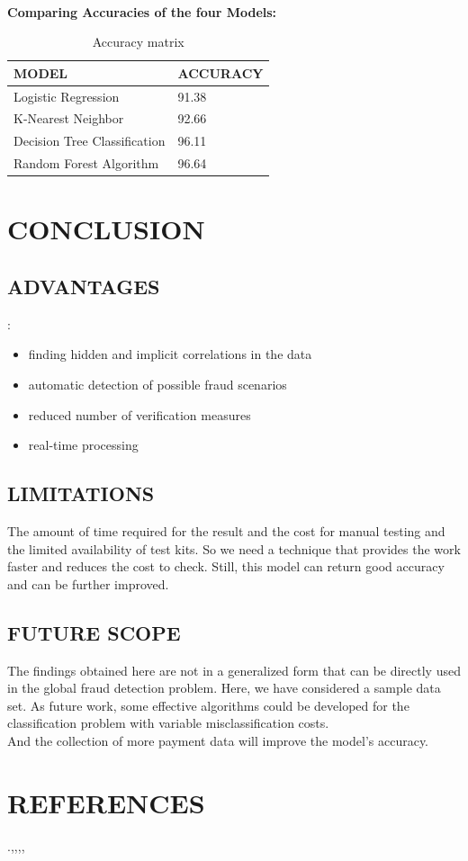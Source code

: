 \documentclass[12pt]{article}
\begin{document}
\\
\textbf{Comparing Accuracies of the four Models:}
\begin{table}[htbp]
\begin{center}
\begin{tabular}{|p{5cm}|p{5cm}|}
\hline
MODEL&ACCURACY\\
\hline
Logistic Regression&91.38\\
\hline
K-Nearest Neighbor&92.66\\
\hline
Decision Tree Classification&96.11\\
\hline
Random Forest Algorithm&96.64\\
\hline
\end{tabular}
\end{center}
\caption{Accuracy matrix}
\end{table}
\pagebreak
\newpage
\section{CONCLUSION}
\subsection{ ADVANTAGES}: 
\begin{itemize}
    \item finding hidden and implicit correlations in the data
    \item automatic detection of possible fraud scenarios
    \item reduced number of verification measures
    \item real-time processing
\end{itemize}

\subsection{LIMITATIONS}  The amount of time required for the result and the cost for manual testing
and the limited availability of test kits. 
So we need a technique that provides the work faster and reduces the cost to check. Still, this model can return good accuracy and can be further improved.




\subsection{FUTURE SCOPE}
The findings obtained here are not in a generalized form that can be directly used in the global fraud detection problem. Here, we have considered a sample data set. As future work, some effective algorithms could be developed for the classification problem with variable misclassification costs.\\
 And the collection of more payment data will improve the model's accuracy.


 






\newpage
\section{REFERENCES}

\cite{r1}.\cite{r2},\cite{r3},\cite{r4},\cite{r5},\cite{r6}


\end{document}
